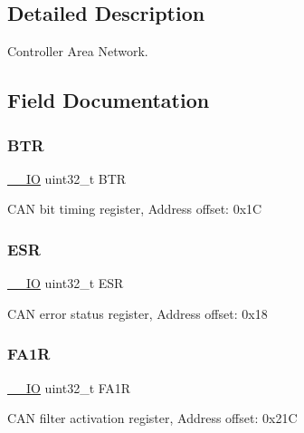 \subsection{Detailed Description}
Controller Area Network. 

\subsection{Field Documentation}
\mbox{\label{struct_c_a_n___type_def_a5c0fcd3e7b4c59ab1dd68f6bd8f74e07}} 
\subsubsection{\texorpdfstring{B\+TR}{BTR}}
{\footnotesize\ttfamily \mbox{\hyperlink{core__sc300_8h_aec43007d9998a0a0e01faede4133d6be}{\+\_\+\+\_\+\+IO}} uint32\+\_\+t B\+TR}

C\+AN bit timing register, Address offset\+: 0x1C \mbox{\label{struct_c_a_n___type_def_a2b39f943954e0e7d177b511d9074a0b7}} 
\subsubsection{\texorpdfstring{E\+SR}{ESR}}
{\footnotesize\ttfamily \mbox{\hyperlink{core__sc300_8h_aec43007d9998a0a0e01faede4133d6be}{\+\_\+\+\_\+\+IO}} uint32\+\_\+t E\+SR}

C\+AN error status register, Address offset\+: 0x18 \mbox{\label{struct_c_a_n___type_def_aaf76271f4ab0b3deb3ceb6e2ac0d62d0}} 
\subsubsection{\texorpdfstring{F\+A1R}{FA1R}}
{\footnotesize\ttfamily \mbox{\hyperlink{core__sc300_8h_aec43007d9998a0a0e01faede4133d6be}{\+\_\+\+\_\+\+IO}} uint32\+\_\+t F\+A1R}

C\+AN filter activation register, Address offset\+: 0x21C \mbox{\label{struct_c_a_n___type_def_af1405e594e39e5b34f9499f680157a25}} 
